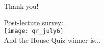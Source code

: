 \documentclass[aspectratio=169, handout]{beamer}
\begin{document}
\begin{frame}[plain]
	\begin{center} Thank you! \end{center}

	\begin{center}
    {\color{blue} \href{https://docs.google.com/forms/d/e/1FAIpQLScWNjKIXl9qUl8Kz6skApKkg9teS0h3_oyoT7UcL1amTN1haw/viewform?usp=sf_link}{Post-lecture survey:}} \\
    \vspace{5pt}
    \texttt{[image: qr\_july6]} \\
    \vspace{5pt}
    And the House Quiz winner is...
  \end{center}
\end{frame}
\end{document}
